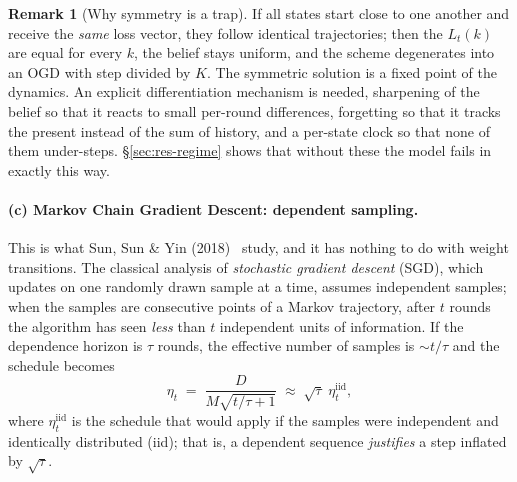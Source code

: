 \documentclass[12pt,a4paper,oneside]{report}
\renewcommand{\_}{\oldunderscore\allowbreak}
\theoremstyle{definition}
\theoremstyle{plain}
\theoremstyle{definition}   %
\newtheorem{remark}[theorem]{Remark}
\begin{document}
\begin{remark}[Why symmetry is a trap]
\label{rem:symmetry}
If all states start close to one another and receive the \emph{same} loss vector, they follow
identical trajectories; then the $L_t(k)$ are equal for every $k$, the belief stays uniform, and
the scheme degenerates into an OGD with step divided by $K$. The symmetric solution is a fixed
point of the dynamics. An explicit differentiation mechanism is needed, sharpening of the
belief so that it reacts to small per-round differences, forgetting so that it tracks the
present instead of the sum of history, and a per-state clock so that none of them under-steps.
\S\ref{sec:res-regime} shows that without these the model fails in exactly this way.
\end{remark}

\paragraph{(c) Markov Chain Gradient Descent: dependent sampling.} This is what Sun, Sun \& Yin
(2018)~\cite{sun2018} study, and it has nothing to do with weight transitions. The classical analysis of
\emph{stochastic gradient descent} (SGD), which updates on one randomly drawn sample at a time,
assumes independent samples; when the samples are consecutive points of a Markov trajectory,
after $t$ rounds the algorithm has seen \emph{less} than $t$ independent units of information. If
the dependence horizon is $\tau$ rounds, the effective number of samples is $\sim t/\tau$ and the
schedule becomes
\[
\eta_t \;=\; \frac{D}{M\sqrt{t/\tau + 1}} \;\approx\; \sqrt{\tau}\;\eta_t^{\text{iid}},
\]
where $\eta_t^{\text{iid}}$ is the schedule that would apply if the samples were independent and
identically distributed (iid); that is, a dependent sequence \emph{justifies} a step inflated by
$\sqrt{\tau}$.
\end{document}
